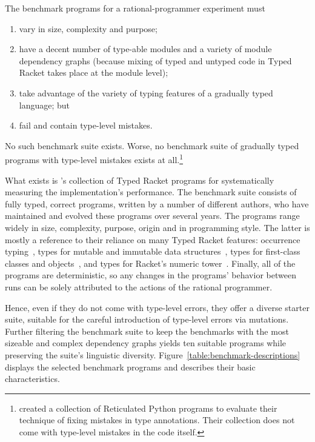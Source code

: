 
The benchmark programs for a rational-programmer experiment must 
\begin{enumerate}
   
\item vary in size, complexity and purpose;
    
\item have a decent number of type-able modules and a variety of module dependency graphs
 (because mixing of typed and untyped code in Typed Racket takes place at the
 module level);

\item take advantage of the variety of typing features of a gradually typed
 language; but

\item fail and contain type-level mistakes. 
\end{enumerate}
No such benchmark suite exists.  Worse, no benchmark suite of
gradually typed programs with type-level mistakes exists at
all.\footnote{\citet{cc-oopsla-20} created a collection of Reticulated
Python programs to evaluate their technique of fixing mistakes in type
annotations. Their collection does not come with type-level mistakes
in the code itself.}

What exists is \citet{gtnffvf-jfp-2019}'s collection of Typed Racket programs
for systematically measuring the implementation's performance. The benchmark
suite consists of fully typed, correct programs, written by a number of
different authors, who have maintained and evolved these programs over several
years. The programs range widely in size, complexity, purpose, origin and in
programming style. The latter is mostly a reference to their reliance on many
Typed Racket features: occurrence typing~\citep{tf-icfp-2010}, types for mutable
and immutable data structures~\citep{hpst-sfp-2010}, types for first-class
classes and objects~\citep{tsdtf-oopsla-2012}, and types for Racket's numeric
tower~\citep{stathff-padl-12}.
Finally, all of the programs are deterministic, so any changes in the programs' behavior
between runs can be solely attributed to the actions of the rational programmer.

Hence, even if they do not come with type-level errors, they offer a diverse
starter suite, suitable for the careful introduction of type-level errors via
mutations. Further filtering the benchmark suite to keep the benchmarks with the
most sizeable and complex dependency graphs yields ten suitable programs while
preserving the suite's linguistic diversity. Figure~\ref{table:benchmark-descriptions} displays the selected
benchmark programs and describes their basic characteristics.
